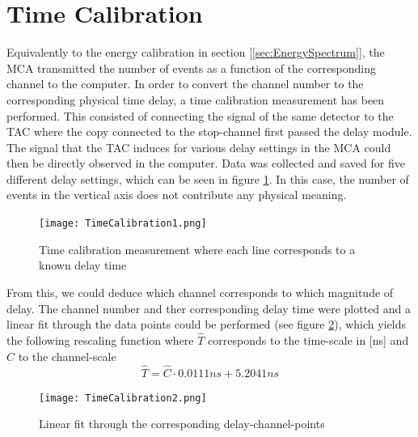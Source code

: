 \documentclass[a4paper,parskip,11pt, DIV12]{scrreprt}
\begin{document}
\section{Time Calibration}

		Equivalently to the energy calibration in section [\ref{sec:EnergySpectrum}], the MCA transmitted the number of events as a function of the corresponding channel to the computer. In order to convert the channel number to the corresponding physical time delay, a time calibration measurement has been performed. This consisted of connecting the signal of the same detector to the TAC where the copy connected to the stop-channel first passed the delay module. The signal that the TAC induces for various delay settings in the MCA could then be directly observed in the computer. Data was collected and saved for five different delay settings, which can be seen in figure \ref{fig:TimeCal1}. In this case, the number of events in the vertical axis does not contribute any physical meaning.
		\begin{figure}[H]
\centering
\texttt{[image: TimeCalibration1.png]}
\caption[TimeCalibration1]{Time calibration measurement where each line corresponds to a known delay time}
\label{fig:TimeCal1}
	\end{figure}
	From this, we could deduce which channel corresponds to which magnitude of delay. The channel number and ther corresponding delay time were plotted and a linear fit through the data points could be performed (see figure \ref{fig:TimeCal2}), which yields the following rescaling function where $\hat{T}$ corresponds to the time-scale in [ns] and $\hat{C}$ to the channel-scale
	\begin{equation}
	\hat{T} = \hat{C} \cdot 0.0111ns + 5.2041ns 
	\end{equation}
	\begin{figure}[H]
\centering
\texttt{[image: TimeCalibration2.png]}
\caption[TimeCalibration2]{Linear fit through the corresponding delay-channel-points}
\label{fig:TimeCal2}
	\end{figure}
\end{document}
